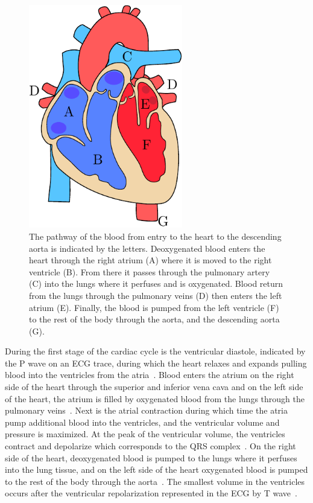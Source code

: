 \begin{figure}
    \centering
    \includegraphics[width=0.6\textwidth]{chapter2-background/imgs/heart_drawing.pdf}
    \caption[Sketch of the anatomical heart]{ The pathway of the blood
    from entry to the heart to the descending aorta is indicated by the
    letters. Deoxygenated blood enters the heart through the right atrium
    (A) where it is moved to the right ventricle (B). From there it passes through 
    the pulmonary artery (C) into the lungs where it perfuses and is oxygenated. 
    Blood return from the lungs through the pulmonary veins (D) then enters 
    the left atrium (E). Finally, the blood is pumped from the left
    ventricle (F) to the rest of the body through the aorta, and the
    descending aorta (G).}
    \label{fig:anatomical_heart}
\end{figure}

During the first stage of the cardiac cycle is the ventricular
diastole, indicated by the P wave on an ECG trace, during 
which the heart relaxes and expands
pulling blood into the ventricles from the 
atria~\parencite{pappano_cardiovascular_2019}. Blood enters the atrium 
on the right side of the heart through the
superior and inferior vena cava and on the left side of the heart, the atrium is 
filled by oxygenated blood from the lungs through the pulmonary 
veins~\parencite{pappano_cardiovascular_2019}.
Next is the atrial contraction during which time the atria pump additional
blood into the ventricles, and the ventricular volume and pressure 
is maximized. At the peak of the ventricular volume, the ventricles contract 
and depolarize which corresponds to the QRS complex~\parencite{pollock_physiology_2021}. 
On the right side of the heart, deoxygenated blood is pumped 
to the lungs where it perfuses into the lung tissue, and on the left side of 
the heart oxygenated blood is pumped to the rest of the body through the 
aorta~\parencite{pappano_cardiovascular_2019}. The smallest volume in the ventricles occurs after 
the ventricular repolarization represented in the ECG by
T wave~\parencite{pollock_physiology_2021}.

